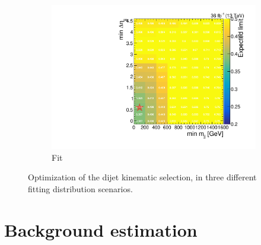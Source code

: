 \begin{figure}[]
\begin{center}
\begin{subfigure}[t]{0.32\textwidth}
            \includegraphics[width=\textwidth]{figures/vbf/opt/optimized_scan_deta_mjj.pdf}
            \caption{Fit \dphi}
        \end{subfigure}
        \caption{Optimization of the dijet kinematic selection, in three different fitting distribution scenarios.}
        \label{fig:vbf:opt}
    \end{center}
\end{figure}

\section{Background estimation}
\label{sec:vbf:bkg}

